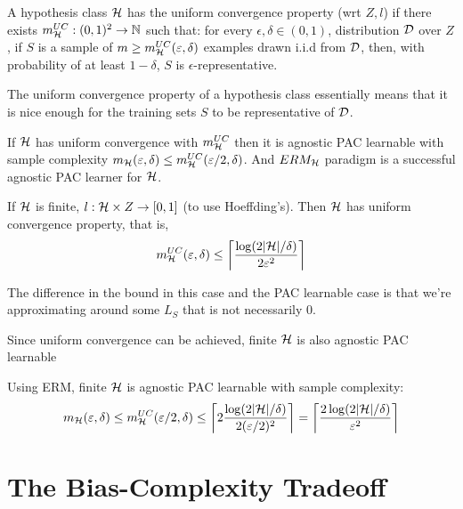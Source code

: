 \documentclass[a4paper, 10pt]{article}
\begin{document}
    \begin{definition} 
    A hypothesis class $\calh$ has the uniform convergence property (wrt $Z, l$) if there exists $m_{\calh}^{UC}: (0, 1)^2 \to \bbn$ such that: for every $\epsilon ,\delta \in (0, 1)$, distribution $\cald$ over $Z$, if $S$ is a sample of $m \geq m_{\calh}^{UC}(\epsilon, \delta)$ examples drawn i.i.d from $\cald$, then, with probability of at least $1-\delta$, $S$ is $\epsilon$-representative.

    The uniform convergence property of a hypothesis class essentially means that it is nice enough for the training sets $S$ to be representative of $\cald$.
    \end{definition}

    \begin{corollary}
        If $\calh$ has uniform convergence with $m_{\calh}^{UC}$ then it is agnostic PAC learnable with sample complexity $m_{\calh} (\epsilon, \delta) \leq m_{\calh}^{UC} (\epsilon/2, \delta)$. And $ERM_{\calh}$ paradigm is a successful agnostic PAC learner for $\calh$.
    \end{corollary}

    \begin{corollary}
    If $\calh$ is finite, $l : \calh \times Z \to [0, 1]$ (to use Hoeffding's). Then $\calh$ has uniform convergence property, that is, \begin{equation*}
    m_{\calh}^{UC} (\epsilon, \delta) \leq \ceil*{{\dfrac{\log(2 \abs{\calh}/\delta)}{2\epsilon^2}}}
    \end{equation*}

    The difference in the bound in this case and the PAC learnable case is that we're approximating around some $L_S$ that is not necessarily 0.
    \end{corollary}
    
    Since uniform convergence can be achieved, finite $\calh$ is also agnostic PAC learnable
    \begin{corollary}
    Using ERM, finite $\calh$ is agnostic PAC learnable with sample complexity:
    \begin{equation*}
    m_{\calh}(\epsilon, \delta) \leq m_{\calh}^{UC}(\epsilon/2, \delta) \leq \ceil*{2 \dfrac{\log(2\abs{\calh}/\delta)}{2(\epsilon/2)^2}} = \ceil*{\dfrac{2\log(2\abs{\calh}/\delta)}{\epsilon^2}}
    \end{equation*}
    \end{corollary}
    
    \section{The Bias-Complexity Tradeoff}
\end{document}

